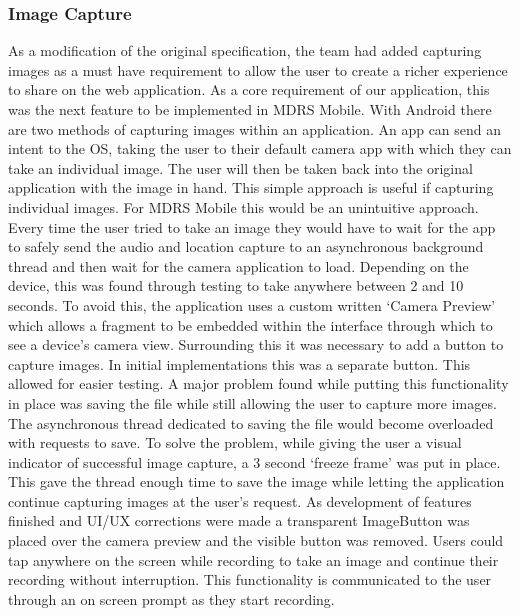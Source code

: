 \documentclass{l3proj}
\begin{document}
\subsubsection{Image Capture}
As a modification of the original specification, the team had added capturing images as a must have requirement to allow the user to create a richer experience to share on the web application. As a core requirement of our application, this was the next feature to be implemented in MDRS Mobile. With Android there are two methods of capturing images within an application. An app can send an intent to the OS, taking the user to their default camera app with which they can take an individual image. The user will then be taken back into the original application with the image in hand. This simple approach is useful if capturing individual images. For MDRS Mobile this would be an unintuitive approach. Every time the user tried to take an image they would have to wait for the app to safely send the audio and location capture to an asynchronous background thread and then wait for the camera application to load. Depending on the device, this was found through testing to take anywhere between 2 and 10 seconds. To avoid this, the application uses a custom written ‘Camera Preview’ which allows a fragment to be embedded within the interface through which to see a device’s camera view. Surrounding this it was necessary to add a button to capture images. In initial implementations this was a separate button. This allowed for easier testing. A major problem found while putting this functionality in place was saving the file while still allowing the user to capture more images. The asynchronous thread dedicated to saving the file would become overloaded with requests to save. To solve the problem, while giving the user a visual indicator of successful image capture, a 3 second ‘freeze frame’ was put in place. This gave the thread enough time to save the image while letting the application continue capturing images at the user's request. As development of features finished and UI/UX corrections were made a transparent ImageButton was placed over the camera preview and the visible button was removed. Users could tap anywhere on the screen while recording to take an image and continue their recording without interruption. This functionality is communicated to the user through an on screen prompt as they start recording.
\end{document}
